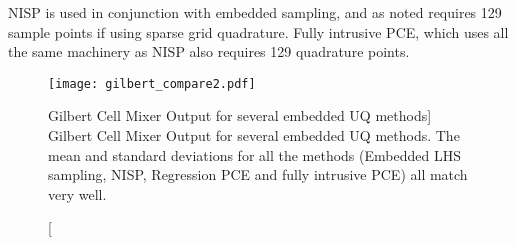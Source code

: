 NISP is used in conjunction with embedded sampling, 
and as noted requires 129 sample points if using sparse grid quadrature.  Fully 
intrusive PCE, which uses all the same machinery as NISP also requires 129 
quadrature points.  



\begin{figure}[hbt]
\centering
\texttt{[image: gilbert\_compare2.pdf]}
\caption
  [Gilbert Cell Mixer Output for several \Xyce{} embedded UQ methods]
  {Gilbert Cell Mixer Output for several \Xyce{} embedded UQ methods.  The mean and standard deviations for all the methods (Embedded LHS sampling, NISP, Regression PCE and fully intrusive PCE) all match very well.}
\label{gilbert_compare}
\end{figure}

\clearpage
